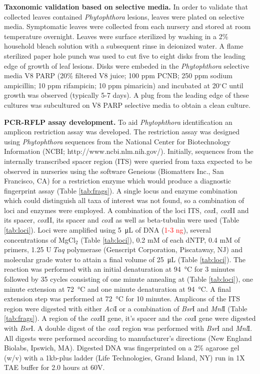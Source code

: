 \documentclass[12pt]{article}
\begin{document}
\textbf{Taxonomic validation based on selective media.} In order to validate that collected leaves contained \emph{Phytophthora} lesions, leaves were plated on selective media.  Symptomatic leaves were collected from each nursery and stored at room temperature overnight.  Leaves were surface sterilized by washing in a 2\% household bleach solution with a subsequent rinse in deionized water.  A flame sterilized paper hole punch was used to cut five to eight disks from the leading edge of growth of leaf lesions.  Disks were embeded in the \emph{Phytophthora} selective media V8 PARP (20\% filtered V8 juice; 100 ppm PCNB; 250 ppm sodium ampicillin; 10 ppm rifampicin; 10 ppm pimaricin)\cite{jeffers_martin_1986} and incubated at 20$^\circ$C until growth was observed (typically 5-7 days).  A plug from the leading edge of these cultures was subcultured on V8 PARP selective media to obtain a clean culture.

\textbf{PCR-RFLP assay development.}  To aid \emph{Phytophthora} identification an amplicon restriction assay was developed.  The restriction assay was designed using \emph{Phytophthora} sequences from the National Center for Biotechnology Information (NCBI; http://www.ncbi.nlm.nih.gov/).  Initially, sequences from the internally transcribed spacer region (ITS) were queried from taxa expected to be observed in nurseries using the software Geneious (Biomatters Inc., San Francisco, CA) for a restriction enzyme which would produce a diagnostic fingerprint assay (Table \ref{tab:frags}).  A single locus and enzyme combination which could distinguish all taxa of interest was not found, so a combination of loci and enzymes were employed.  A combination of the loci ITS, \emph{cox}I, \emph{cox}II and its spacer, \emph{cox}II, its spacer and \emph{cox}I as well as beta-tubulin were used (Table \ref{tab:loci}).  Loci were amplified using \SI{5}{\micro\liter} of DNA (\textcolor{red}{1-3 ng}), several concentrations of MgCl$_{2}$ (Table \ref{tab:loci}), 0.2 mM of each dNTP, 0.4 mM of primers, 1.25 U $Taq$ polymerase (Genscript Corporation, Piscataway, NJ) and molecular grade water to attain a final volume of \SI{25}{\micro\liter} (Table \ref{tab:loci}).  The reaction was performed with an initial denaturation at \SI{94}{\celsius} for 3 minutes followed by 35 cycles consisting of one minute annealing at (Table \ref{tab:loci}), one minute extension at \SI{72}{\celsius} and one minute denaturation at \SI{94}{\celsius}.  A final extension step was performed at \SI{72}{\celsius} for 10 minutes.  Amplicons of the ITS region were digested with either \emph{Aci}I or a combination of \emph{Bsr}I and \emph{Mnl}I (Table \ref{tab:frags}).  A region of the \emph{cox}II gene, it's spacer and the \emph{cox}I gene were digested with \emph{Bsr}I.  A double digest of the \emph{cox}I region was performed with \emph{Bsr}I and \emph{Mnl}I.  All digests were performed according to manufacturer's directions (New England Biolabs, Ipswich, MA).  Digested DNA was fingerprinted on a 2\% agarose gel (w/v) with a 1kb-plus ladder (Life Technologies, Grand Island, NY) run in 1X TAE buffer for 2.0 hours at 60V.
\end{document}
